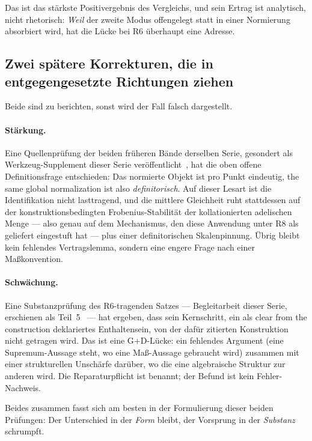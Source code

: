 \documentclass[11pt,a4paper]{article}
\theoremstyle{definition}
\begin{document}
Das ist das stärkste Positivergebnis des Vergleichs, und sein Ertrag ist
analytisch, nicht rhetorisch: \emph{Weil} der zweite Modus offengelegt statt in
einer Normierung absorbiert wird, hat die Lücke bei R6 überhaupt eine Adresse.

\subsection{Zwei spätere Korrekturen, die in entgegengesetzte Richtungen ziehen}
\label{sec:caseC-nachtraege}

Beide sind zu berichten, sonst wird der Fall falsch dargestellt.

\paragraph{Stärkung.} Eine Quellenprüfung der beiden früheren Bände derselben
Serie, gesondert als Werkzeug-Supplement dieser Serie
veröffentlicht~\cite{GeigerGNC2026}, hat die oben offene Definitionsfrage
entschieden: Das normierte Objekt ist pro Punkt eindeutig, \glqq the same global
normalization\grqq{} ist also \emph{definitorisch}. Auf dieser Lesart ist die Identifikation nicht lasttragend,
und die mittlere Gleichheit ruht stattdessen auf der konstruktionsbedingten
Frobenius-Stabilität der kollationierten adelischen Menge --- also genau auf dem
Mechanismus, den diese Anwendung unter R8 als geliefert eingestuft hat --- plus
einer definitorischen Skalenpinnung. Übrig bleibt kein fehlendes Vertragslemma,
sondern eine engere Frage nach einer Maßkonvention.

\paragraph{Schwächung.} Eine Substanzprüfung des R6-tragenden Satzes ---
Begleitarbeit dieser Serie, erschienen als Teil~5~\cite{GeigerSubstance2026} --- hat
ergeben, dass sein Kernschritt, ein als \glqq clear from the construction\grqq{} deklariertes
Enthaltensein, von der dafür zitierten Konstruktion nicht getragen wird. Das
ist eine G+D-Lücke: ein fehlendes Argument (eine Supremum-Aussage steht, wo eine
Maß-Aussage gebraucht wird) zusammen mit einer strukturellen Unschärfe darüber, wo
die eine algebraische Struktur zur anderen wird. Die Reparaturpflicht ist benannt;
der Befund ist kein Fehler-Nachweis.

Beides zusammen fasst sich am besten in der Formulierung dieser beiden
Prüfungen: Der Unterschied in der \emph{Form} bleibt, der Vorsprung in der
\emph{Substanz} schrumpft.
\end{document}
